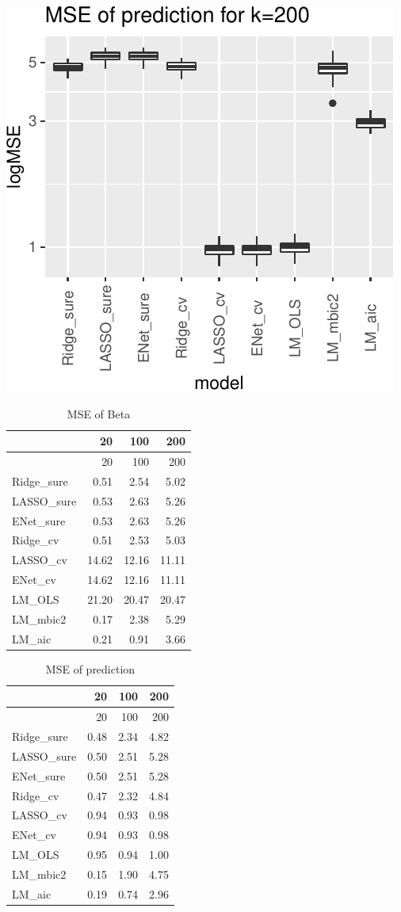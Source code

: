\documentclass[
]{article}
\begin{document}
\includegraphics[width=0.8\linewidth]{report_files/figure-latex/unnamed-chunk-10-6}

\begin{longtable}[]{@{}lrrr@{}}
\caption{MSE of Beta}\tabularnewline
\toprule
& 20 & 100 & 200 \\
\midrule
\endfirsthead
\toprule
& 20 & 100 & 200 \\
\midrule
\endhead
Ridge\_sure & 0.51 & 2.54 & 5.02 \\
LASSO\_sure & 0.53 & 2.63 & 5.26 \\
ENet\_sure & 0.53 & 2.63 & 5.26 \\
Ridge\_cv & 0.51 & 2.53 & 5.03 \\
LASSO\_cv & 14.62 & 12.16 & 11.11 \\
ENet\_cv & 14.62 & 12.16 & 11.11 \\
LM\_OLS & 21.20 & 20.47 & 20.47 \\
LM\_mbic2 & 0.17 & 2.38 & 5.29 \\
LM\_aic & 0.21 & 0.91 & 3.66 \\
\bottomrule
\end{longtable}

\begin{longtable}[]{@{}lrrr@{}}
\caption{MSE of prediction}\tabularnewline
\toprule
& 20 & 100 & 200 \\
\midrule
\endfirsthead
\toprule
& 20 & 100 & 200 \\
\midrule
\endhead
Ridge\_sure & 0.48 & 2.34 & 4.82 \\
LASSO\_sure & 0.50 & 2.51 & 5.28 \\
ENet\_sure & 0.50 & 2.51 & 5.28 \\
Ridge\_cv & 0.47 & 2.32 & 4.84 \\
LASSO\_cv & 0.94 & 0.93 & 0.98 \\
ENet\_cv & 0.94 & 0.93 & 0.98 \\
LM\_OLS & 0.95 & 0.94 & 1.00 \\
LM\_mbic2 & 0.15 & 1.90 & 4.75 \\
LM\_aic & 0.19 & 0.74 & 2.96 \\
\bottomrule
\end{longtable}
\end{document}
